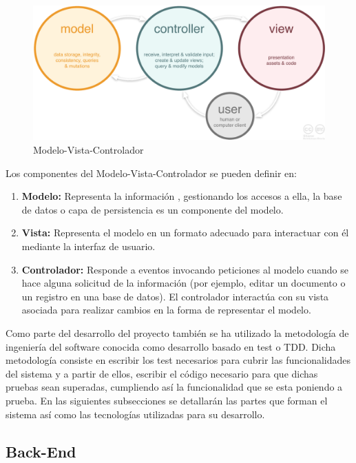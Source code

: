 \documentclass[a4paper,11pt]{book}
\begin{document}
\begin{figure}[H] 
\centering 
\includegraphics[scale=0.20]{imagenes/mvc.png}
\caption{ Modelo-Vista-Controlador\cite{mvc2}  }  
\end{figure} 

Los componentes\cite{mvc3}\cite{mvc4} del Modelo-Vista-Controlador se pueden definir en:

\begin{enumerate}
\item \textbf{Modelo:} Representa la información , gestionando los accesos a ella, la base de datos  o capa de persistencia es un componente del modelo. 

\item \textbf{Vista:} Representa el modelo en un formato adecuado para interactuar con él mediante la interfaz de usuario.  

\item \textbf{Controlador:} Responde a eventos invocando peticiones al modelo cuando se hace alguna solicitud de la información (por ejemplo, editar un documento o un registro en una base de datos). El controlador interactúa con su vista asociada para realizar cambios en la forma de representar el modelo. 
\end{enumerate}


Como parte del desarrollo del proyecto también se ha utilizado la metodología de ingeniería del software conocida como desarrollo basado en test o TDD. Dicha metodología consiste en escribir los test necesarios para cubrir las funcionalidades del sistema y a partir de ellos, escribir el código necesario para que dichas pruebas sean superadas, cumpliendo así la funcionalidad que se esta poniendo a prueba.  En las siguientes subsecciones se detallarán las partes que forman el sistema así como las tecnologías utilizadas para su desarrollo. 

\subsection{Back-End}
\end{document}
